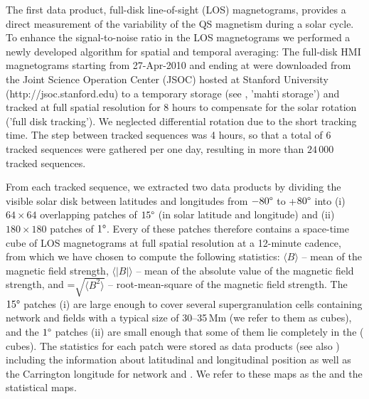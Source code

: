 \documentclass{aa}
\begin{document}
The first data product, full-disk line-of-sight (LOS) magnetograms, provides a direct measurement of the variability of the %
QS
magnetism during a solar cycle. To enhance the signal-to-noise ratio in the LOS magnetograms we performed a newly developed algorithm for spatial and temporal averaging: The full-disk HMI magnetograms starting from 27-Apr-2010 and ending at 
were downloaded from the Joint Science Operation Center (JSOC) hosted at Stanford University (http://jsoc.stanford.edu) to a temporary storage (see , 'mahti storage') and tracked at full spatial resolution for 8 hours to compensate for the solar rotation ('full disk tracking').
We neglected differential rotation due to
the short tracking time.
The step between tracked sequences was 4 hours, so that a total of 6 tracked sequences were gathered per one day, resulting in more than 
$24\,000$ tracked sequences.

From each tracked sequence, we extracted two data products by dividing the visible solar disk  between latitudes and longitudes from $-80\degree$ to +$80\degree$ into (i) $64\times 64$  overlapping patches of $15\degree$ (in solar latitude and longitude)  and (ii) $180\times 180$ patches of $1\degree$.
Every of these patches therefore contains a space-time cube of LOS magnetograms at full spatial resolution at a 12-minute cadence, %
from which we have chosen to compute the following statistics:
$\langle B\rangle$ -- mean of the magnetic field strength, $\langle|B|\rangle$ -- mean of the absolute value of the magnetic field strength, and %
\brms{}=$\sqrt{\langle B^2\rangle}$ -- root-mean-square of the magnetic field strength.
The $15\degree$ patches (i) are large enough to cover several supergranulation cells containing network and \IN{} fields \cite[]{2010LRSP....7....2R} with a typical size of 30--35\,Mm (we refer to them as \nw{} cubes), and the $1\degree$ patches (ii) are small enough that some of them lie completely in the \IN{} (\inw{} cubes). 
The statistics for each patch were stored as data products (see also ) including the information about 
latitudinal and longitudinal position as well as the Carrington %
longitude for network and \IN{}. We refer to these maps as the \nw{} and the \inw{} statistical maps.
\end{document}
